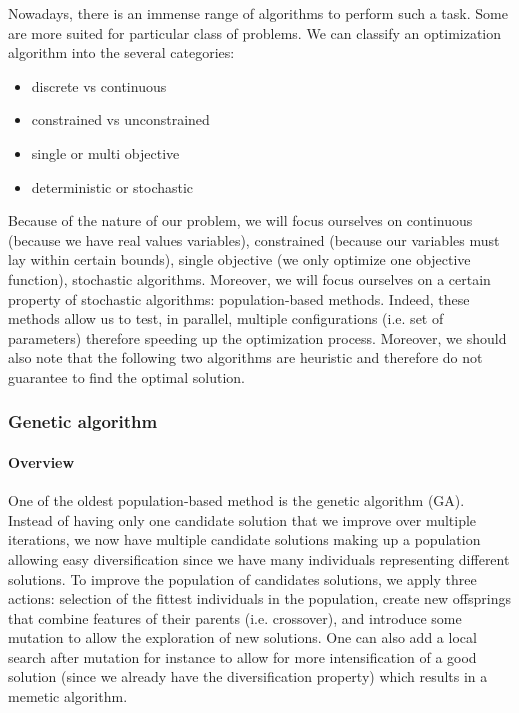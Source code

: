     Nowadays, there is an immense range of algorithms to perform such a task. Some are more suited for particular class of problems. We can classify an optimization algorithm into the several categories:

    \begin{itemize}
        \item discrete vs continuous
        \item constrained vs unconstrained
        \item single or multi objective
        \item deterministic or stochastic
    \end{itemize}
    
    Because of the nature of our problem, we will focus ourselves on continuous (because we have real values variables), constrained (because our variables must lay within certain bounds), single objective (we only optimize one objective function), stochastic algorithms. Moreover, we will focus ourselves on a certain property of stochastic algorithms: population-based methods. Indeed, these methods allow us to test, in parallel, multiple configurations (i.e. set of parameters) therefore speeding up the optimization process. Moreover, we should also note that the following two algorithms are heuristic and therefore do not guarantee to find the optimal solution. 

    \subsubsection{Genetic algorithm}

    \paragraph{Overview}
        One of the oldest population-based method is the genetic algorithm (GA). Instead of having only one candidate solution that we improve over multiple iterations, we now have multiple candidate solutions making up a population allowing easy diversification since we have many individuals representing different solutions. To improve the population of candidates solutions, we apply three actions: selection of the fittest individuals in the population, create new offsprings that combine features of their parents (i.e. crossover), and introduce some mutation to allow the exploration of new solutions. One can also add a local search after mutation for instance to allow for more intensification of a good solution (since we already have the diversification property) which results in a memetic algorithm. \cite{contiGA} \cite{holland1992genetic}

